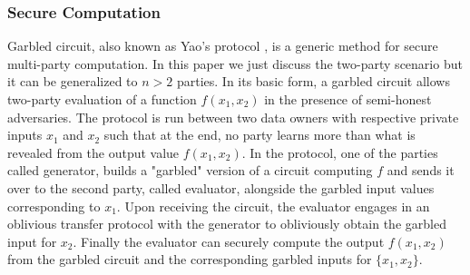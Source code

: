 \subsubsection{Secure Computation}
Garbled circuit, also known as Yao's protocol \cite{Yao,yao2},  is a generic method for secure multi-party computation. In this paper we just discuss the two-party scenario but it can be generalized to $n > 2$ parties. In its basic form, a garbled circuit allows two-party evaluation of a function $f(x_1,x_2)$ in the presence of semi-honest adversaries. The protocol is run between two data owners with respective private inputs $x_1$ and $x_2$ such that at the end, no party learns more  
than what is revealed from the output value $f(x_1,x_2)$. In the protocol, one of the parties called
generator, builds a "garbled" version of a circuit computing $f$ and sends it over to the second party, called evaluator, alongside the garbled input values 
corresponding to $x_1$.  Upon receiving the circuit, the evaluator 
engages in an oblivious transfer protocol with the generator to obliviously obtain the garbled input for $x_2$. Finally the evaluator can securely compute the  output $f(x_1, x_2)$ from the garbled circuit and the corresponding garbled inputs for $\{x_1,x_2\}$.
